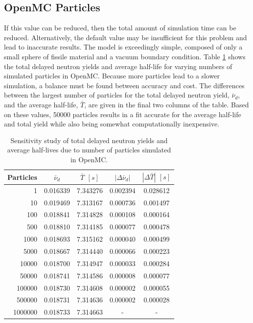 \subsection{OpenMC Particles}

If this value can be reduced, then the total amount of simulation time can be reduced.
Alternatively, the default value may be insufficient for this problem and lead to inaccurate results.
The model is exceedingly simple, composed of only a small sphere of fissile material and a vacuum boundary condition.
Table \ref{tab:omc-nps} shows the total delayed neutron yields and average half-life for varying numbers of simulated particles in OpenMC.
Because more particles lead to a slower simulation, a balance must be found between accuracy and cost.
The differences between the largest number of particles for the total delayed neutron yield, $\bar{\nu}_d$, and the average half-life, $\bar{T}$, are given in the final two columns of the table.
Based on these values, 50000 particles results in a fit accurate for the average half-life and total yield while also being somewhat computationally inexpensive.


\begin{table}[H]
    \centering
    \begin{tabular}{rcccc}
    \hline
Particles & $\bar{\nu}_d$ & $\bar{T}$ $[s]$ & $|\Delta \bar{\nu}_d|$ & $|\Delta \bar{T}|$ $[s]$ \\
\hline
1 & 0.016339 & 7.343276 & 0.002394 & 0.028612 \\
10 & 0.019469 & 7.313167 & 0.000736 & 0.001497 \\
100 & 0.018841 & 7.314828 & 0.000108 & 0.000164 \\
500 & 0.018810 & 7.314185 & 0.000077 & 0.000478 \\
1000 & 0.018693 & 7.315162 & 0.000040 & 0.000499 \\
5000 & 0.018667 & 7.314440 & 0.000066 & 0.000223 \\
10000 & 0.018700 & 7.314947 & 0.000033 & 0.000284 \\
50000 & 0.018741 & 7.314586 & 0.000008 & 0.000077 \\
100000 & 0.018730 & 7.314608 & 0.000002 & 0.000055 \\
500000 & 0.018731 & 7.314636 & 0.000002 & 0.000028 \\
1000000 & 0.018733 & 7.314663 & - & - \\
\hline
    \end{tabular}
    \caption{Sensitivity study of total delayed neutron yields and average half-lives due to number of particles simulated in OpenMC.}
    \label{tab:omc-nps}
\end{table}

